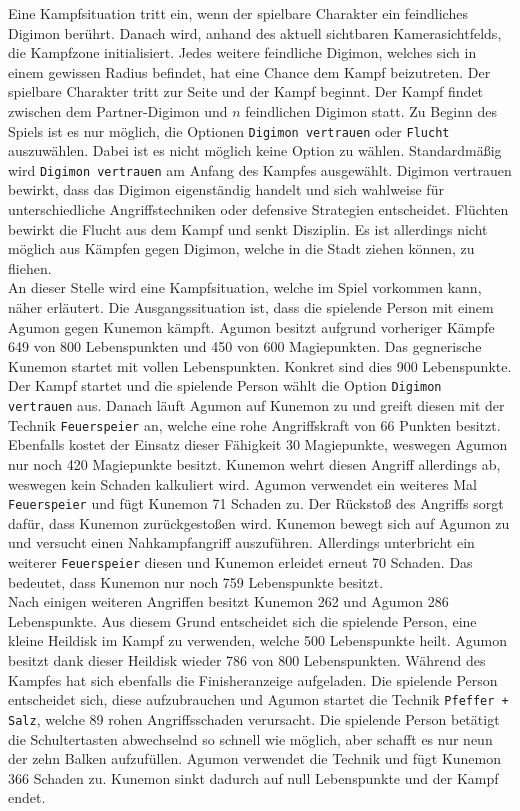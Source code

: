Eine Kampfsituation tritt ein, wenn der spielbare Charakter ein feindliches Digimon berührt.
Danach wird, anhand des aktuell sichtbaren Kamerasichtfelds, die Kampfzone initialisiert\cite{combat-asm}.
Jedes weitere feindliche Digimon, welches sich in einem gewissen Radius befindet, hat eine Chance dem Kampf beizutreten.
Der spielbare Charakter tritt zur Seite und der Kampf beginnt.
Der Kampf findet zwischen dem Partner-Digimon und $n$ feindlichen Digimon statt.
Zu Beginn des Spiels ist es nur möglich, die Optionen \texttt{Digimon vertrauen} oder \texttt{Flucht} auszuwählen.
Dabei ist es nicht möglich keine Option zu wählen.
Standardmäßig wird \texttt{Digimon vertrauen} am Anfang des Kampfes ausgewählt.
Digimon vertrauen bewirkt, dass das Digimon eigenständig handelt und sich wahlweise für unterschiedliche Angriffstechniken oder defensive Strategien entscheidet.
Flüchten bewirkt die Flucht aus dem Kampf und senkt Disziplin.
Es ist allerdings nicht möglich aus Kämpfen gegen Digimon, welche in die Stadt ziehen können, zu fliehen.\\

An dieser Stelle wird eine Kampfsituation, welche im Spiel vorkommen kann, näher erläutert.
Die Ausgangssituation ist, dass die spielende Person mit einem Agumon gegen Kunemon kämpft.
Agumon besitzt aufgrund vorheriger Kämpfe 649 von 800 Lebenspunkten und 450 von 600 Magiepunkten.
Das gegnerische Kunemon startet mit vollen Lebenspunkten.
Konkret sind dies 900 Lebenspunkte.
Der Kampf startet und die spielende Person wählt die Option \texttt{Digimon vertrauen} aus.
Danach läuft Agumon auf Kunemon zu und greift diesen mit der Technik \texttt{Feuerspeier} an, welche eine rohe Angriffskraft von 66 Punkten besitzt.
Ebenfalls kostet der Einsatz dieser Fähigkeit 30 Magiepunkte, weswegen Agumon nur noch 420 Magiepunkte besitzt.
Kunemon wehrt diesen Angriff allerdings ab, weswegen kein Schaden kalkuliert wird.
Agumon verwendet ein weiteres Mal \texttt{Feuerspeier} und fügt Kunemon 71 Schaden zu.
Der Rückstoß des Angriffs sorgt dafür, dass Kunemon zurückgestoßen wird.
Kunemon bewegt sich auf Agumon zu und versucht einen Nahkampfangriff auszuführen.
Allerdings unterbricht ein weiterer \texttt{Feuerspeier} diesen und Kunemon erleidet erneut 70 Schaden.
Das bedeutet, dass Kunemon nur noch 759 Lebenspunkte besitzt.\\

Nach einigen weiteren Angriffen besitzt Kunemon 262 und Agumon 286 Lebenspunkte.
Aus diesem Grund entscheidet sich die spielende Person, eine kleine Heildisk im Kampf zu verwenden, welche 500 Lebenspunkte heilt.
Agumon besitzt dank dieser Heildisk wieder 786 von 800 Lebenspunkten.
Während des Kampfes hat sich ebenfalls die Finisheranzeige aufgeladen.
Die spielende Person entscheidet sich, diese aufzubrauchen und Agumon startet die Technik \texttt{Pfeffer + Salz}, welche 89 rohen Angriffsschaden verursacht.
Die spielende Person betätigt die Schultertasten abwechselnd so schnell wie möglich, aber schafft es nur neun der zehn Balken aufzufüllen.
Agumon verwendet die Technik und fügt Kunemon 366 Schaden zu.
Kunemon sinkt dadurch auf null Lebenspunkte und der Kampf endet. \\

